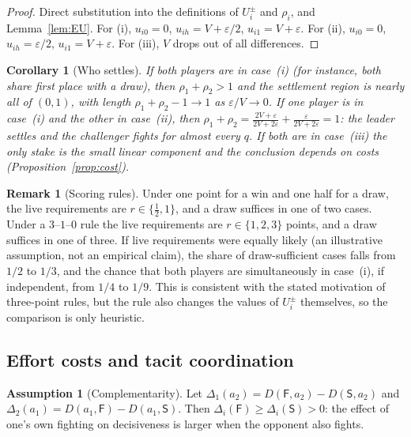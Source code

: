 \documentclass[11pt]{article}
\newtheorem{corollary}{Corollary}
\theoremstyle{definition}
\newtheorem{assumption}{Assumption}
\newtheorem{remark}{Remark}
\newcommand{\Sset}{\mathsf{S}}   %
\newcommand{\Fset}{\mathsf{F}}   %
\begin{document}
\begin{proof}
Direct substitution into the definitions of $U_i^{\pm}$ and $\rho_i$, and
Lemma~\ref{lem:EU}. For (i), $u_{i0}=0$, $u_{ih}=V+\varepsilon/2$,
$u_{i1}=V+\varepsilon$. For (ii), $u_{i0}=0$, $u_{ih}=\varepsilon/2$,
$u_{i1}=V+\varepsilon$. For (iii), $V$ drops out of all differences.
\end{proof}

\begin{corollary}[Who settles]\label{cor:who}
If both players are in case~(i) (for instance, both share first place with
a draw), then $\rho_1+\rho_2>1$ and the settlement region is nearly all of
$(0,1)$, with length $\rho_1+\rho_2-1\to1$ as $\varepsilon/V\to0$. If one
player is in case~(i) and the other in case~(ii), then
$\rho_1+\rho_2=\tfrac{2V+\varepsilon}{2V+2\varepsilon}+\tfrac{\varepsilon}{2V+2\varepsilon}=1$:
the leader settles and the challenger fights for almost every $q$. If both
are in case~(iii) the only stake is the small linear component and the
conclusion depends on costs (Proposition~\ref{prop:cost}).
\end{corollary}

\begin{remark}[Scoring rules]\label{rem:scoring}
Under one point for a win and one half for a draw, the live requirements are
$r\in\{\tfrac12,1\}$, and a draw suffices in one of two cases. Under a
$3$--$1$--$0$ rule the live requirements are $r\in\{1,2,3\}$ points, and a draw
suffices in one of three. If live requirements were equally likely (an
illustrative assumption, not an empirical claim), the share of
draw-sufficient cases falls from $1/2$ to $1/3$, and the chance that both
players are simultaneously in case~(i), if independent, from $1/4$ to $1/9$.
This is consistent with the stated motivation of three-point rules, but the
rule also changes the values of $U_i^{\pm}$ themselves, so the comparison is
only heuristic.
\end{remark}

\subsection{Effort costs and tacit coordination}

\begin{assumption}[Complementarity]\label{as:comp}
Let $\Delta_1(a_2)=D(\Fset,a_2)-D(\Sset,a_2)$ and
$\Delta_2(a_1)=D(a_1,\Fset)-D(a_1,\Sset)$. Then
$\Delta_i(\Fset)\ge\Delta_i(\Sset)>0$: the effect of one's own fighting on
decisiveness is larger when the opponent also fights.
\end{assumption}
\end{document}
